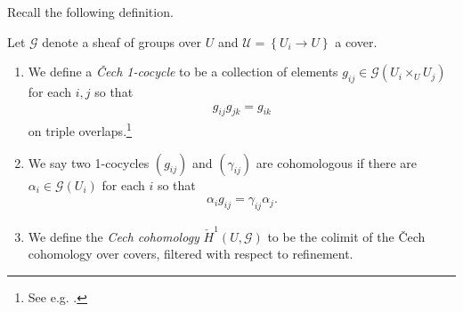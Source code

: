 \documentclass[11pt]{amsart}
\begin{document}
Recall the following definition.

\begin{definition}\label{def:cech-cover-cohomology} 
Let $\mathcal{G}$ denote a sheaf of groups over $U$ and $\mathcal{U} = \left\{ U_i \to U \right\}$ a cover.
\begin{enumerate}
    \item We define a \textit{\v{C}ech 1-cocycle} to be a collection of elements $g_{ij} \in \mathcal{G}(U_i \times_U U_j)$ for each $i,j$ so that
\begin{align*}
    g_{ij}g_{jk} = g_{ik}
\end{align*}
on triple overlaps.\footnote{See e.g. \cite[\S11]{MilneLEC}.}
    \item We say two 1-cocycles $(g_{ij})$ and $(\gamma_{ij})$ are cohomologous if there are $\alpha_i \in \mathcal{G}(U_i)$ for each $i$ so that
    \begin{align*}
        \alpha_i g_{ij} = \gamma_{ij} \alpha_j.
    \end{align*}
    \item We define the \textit{Cech cohomology} $\check{H}^1(U,\mathcal{G})$ to be the colimit of the \v{C}ech cohomology over covers, filtered with respect to refinement.
\end{enumerate}
\end{definition}
\end{document}
